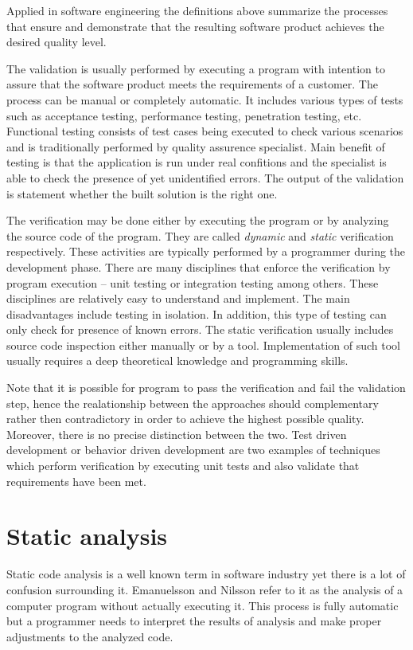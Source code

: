 \documentclass[12pt,final,oneside]{fithesis2}
\begin{document}
Applied in software engineering the definitions above summarize the
processes that ensure and demonstrate that the resulting software product
achieves the desired quality level.

The validation is usually performed by executing a program with intention
to assure that the software product meets the requirements of a customer.
The process can be manual or completely automatic. It includes
various types of tests such as acceptance testing, performance testing,
penetration testing, etc. Functional testing consists of test cases
being executed to check various scenarios and is traditionally performed
by quality assurence specialist. Main benefit of testing is that the
application is run under real confitions and the specialist is able to
check the presence of yet unidentified errors. The output of the validation
is statement whether the built solution is the right one.

The verification may be done either by executing the program or by
analyzing the source code of the program. They are called \textit{dynamic}
and \textit{static} verification respectively. These activities are
typically performed by a programmer during the development phase.
There are many disciplines that enforce the verification by program
execution -- unit testing or integration testing among others. These
disciplines are relatively easy to understand and implement. The main
disadvantages include testing in isolation. In addition, this type of
testing can only check for presence of known errors. The static
verification usually includes source code inspection either manually or
by a tool. Implementation of such tool usually requires a deep
theoretical knowledge and programming skills.

Note that it is possible for program to pass the verification and
fail the validation step, hence the realationship between the approaches
should complementary rather then contradictory in order to achieve the
highest possible quality. Moreover, there is no
precise distinction between the two. Test driven development or behavior
driven development are two examples of techniques which perform
verification by executing unit tests and also validate that requirements
have been met.


\section{Static analysis}

Static code analysis is a well known term in software industry yet there
is a lot of confusion surrounding it. Emanuelsson and Nilsson
\cite{EmanuelssonNilsson08-1} refer to it as the analysis of a computer
program without actually executing it. This process is fully automatic
but a programmer needs to interpret the results of analysis and make
proper adjustments to the analyzed code.
\end{document}
